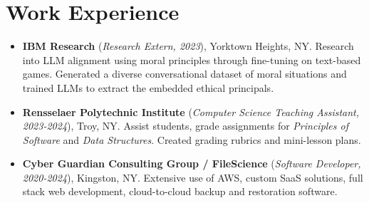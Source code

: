 \documentclass[11pt]{article}
\begin{document}
\section*{Work Experience}
\begin{itemize}
    \itemsep0em 

    \item \textbf{IBM Research} (\textit{Research Extern, 2023}), Yorktown Heights, NY. Research into LLM alignment using moral principles through fine-tuning on text-based games. Generated a diverse conversational dataset of moral situations and trained LLMs to extract the embedded ethical principals.
    \item \textbf{Rensselaer Polytechnic Institute} (\textit{Computer Science Teaching Assistant, 2023-2024}), Troy, NY. Assist students, grade assignments for \textit{Principles of Software} and \textit{Data Structures}. Created grading rubrics and mini-lesson plans.
    
    \item \textbf{Cyber Guardian Consulting Group / FileScience} (\textit{Software Developer, 2020-2024}), Kingston, NY. Extensive use of AWS, custom SaaS solutions, full stack web development, cloud-to-cloud backup and restoration software.

\end{itemize}
\end{document}
